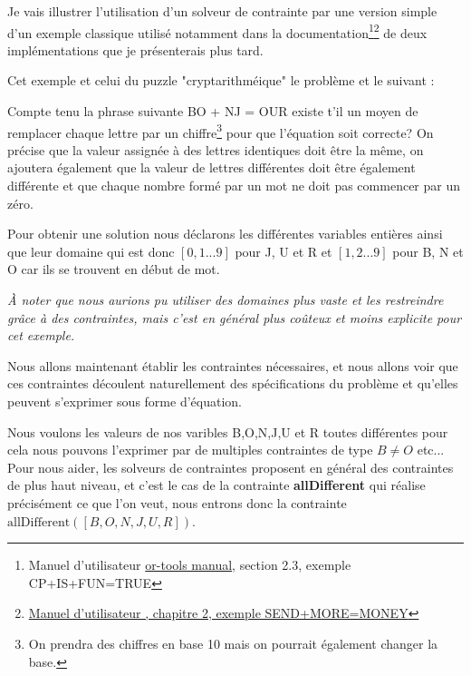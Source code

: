 
Je vais illustrer l'utilisation d'un solveur de contrainte par une version simple d'un exemple classique utilisé notamment dans la documentation\footnote{Manuel d'utilisateur \ortools{} \href{https://drive.google.com/file/d/0B7kalaGEbfufQ0h0N3J4TkVVaDQ/view?usp=sharing}{or-tools manual}, section 2.3, exemple CP+IS+FUN=TRUE}\footnote{\href{http://www.gecode.org/doc-latest/MPG.pdf}{Manuel d'utilisateur \gecode{}, chapitre 2, exemple SEND+MORE=MONEY}} de deux implémentations que je présenterais plus tard.

Cet exemple et celui du puzzle "cryptarithméique" le problème et le suivant :

Compte tenu la phrase suivante BO + NJ = OUR existe t'il un moyen de remplacer chaque lettre par un chiffre\footnote{On prendra des chiffres en base 10 mais on pourrait également changer la base.} pour que l'équation soit correcte? On précise que la valeur assignée à des lettres identiques doit être la même, on ajoutera également que la valeur de lettres différentes doit être également différente et que chaque nombre formé par un mot ne doit pas commencer par un zéro.

Pour obtenir une solution nous déclarons les différentes variables entières ainsi que leur domaine qui est donc $[0,1...9]$ pour J, U et R et $[1,2...9]$ pour B, N et O car ils se trouvent en début de mot.

\emph{À noter que nous aurions pu utiliser des domaines plus vaste et les restreindre grâce à des contraintes, mais c'est en général plus coûteux et moins explicite pour cet exemple.}

Nous allons maintenant établir les contraintes nécessaires, et nous allons voir que ces contraintes découlent naturellement des spécifications du problème et qu'elles peuvent s'exprimer sous forme d'équation.

Nous voulons les valeurs de nos varibles B,O,N,J,U et R toutes différentes pour cela nous pouvons l'exprimer par de multiples contraintes de type $B \neq O$ etc... Pour nous aider, les solveurs de contraintes proposent en général des contraintes de plus haut niveau, et c'est le cas de la contrainte \textbf{allDifferent} qui réalise précisément ce que l'on veut, nous entrons donc la contrainte $\mathrm{allDifferent}([B,O,N,J,U,R])$.

